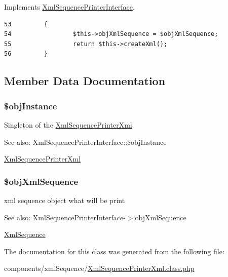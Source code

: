 Implements \hyperlink{interface_xml_sequence_printer_interface_7a8a4630e9f25847da0a6de87a5ab7e0}{XmlSequencePrinterInterface}.

\begin{Code}\begin{verbatim}53         {
54                 $this->objXmlSequence = $objXmlSequence;
55                 return $this->createXml();      
56         }
\end{verbatim}
\end{Code}




\subsection{Member Data Documentation}
\hypertarget{class_xml_sequence_printer_xml_917d057900327b25608ed26c927eac3b}{
\subsubsection[{\$objInstance}]{\setlength{\rightskip}{0pt plus 5cm}\$objInstance}}
\label{class_xml_sequence_printer_xml_917d057900327b25608ed26c927eac3b}


Singleton of the \hyperlink{class_xml_sequence_printer_xml}{XmlSequencePrinterXml}

\begin{Desc}
\item[See also:]XmlSequencePrinterInterface::\$objInstance\end{Desc}
\hyperlink{class_xml_sequence_printer_xml}{XmlSequencePrinterXml} \hypertarget{class_xml_sequence_printer_xml_eefa469c1b13fe1fec040c910b720034}{
\subsubsection[{\$objXmlSequence}]{\setlength{\rightskip}{0pt plus 5cm}\$objXmlSequence}}
\label{class_xml_sequence_printer_xml_eefa469c1b13fe1fec040c910b720034}


xml sequence object what will be print

\begin{Desc}
\item[See also:]XmlSequencePrinterInterface-$>$objXmlSequence\end{Desc}
\hyperlink{class_xml_sequence}{XmlSequence} 

The documentation for this class was generated from the following file:\begin{CompactItemize}
\item 
components/xmlSequence/\hyperlink{_xml_sequence_printer_xml_8class_8php}{XmlSequencePrinterXml.class.php}\end{CompactItemize}
